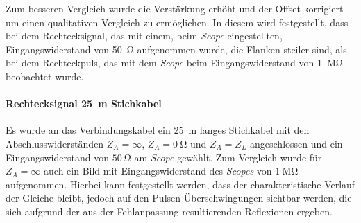 \documentclass[a4paper,twoside,final]{article}
\begin{document}
Zum besseren Vergleich wurde die Verstärkung erhöht und der Offset korrigiert um einen qualitativen Vergleich zu ermöglichen. In diesem wird festgestellt, dass bei dem Rechtecksignal, das mit einem, beim \textit{Scope} eingestellten, Eingangswiderstand von \SI{50}{\ohm} aufgenommen wurde, die Flanken steiler sind, als bei dem Rechteckpuls, das mit dem \textit{Scope} beim Eingangswiderstand von \SI{1}{\mega\ohm} beobachtet wurde.

\paragraph{Rechtecksignal \SI{25}{\metre} Stichkabel}\label{par:Stichkabel}
Es wurde an das Verbindungskabel ein \SI{25}{\metre} langes Stichkabel mit den Abschlusswiderständen $Z_A = \infty $, $Z_A = \SI{0}{\ohm}$ und $Z_A = Z_L$ angeschlossen und ein Eingangswiderstand von $\SI{50}{\ohm}$ am \textit{Scope} gewählt. Zum Vergleich wurde für $Z_A = \infty$ auch ein Bild mit Eingangswiderstand des \textit{Scopes} von $\SI{1}{\mega\ohm}$ aufgenommen. Hierbei kann festgestellt werden, dass der charakteristische Verlauf der Gleiche bleibt, jedoch auf den Pulsen Überschwingungen sichtbar werden, die sich aufgrund der aus der Fehlanpassung resultierenden Reflexionen ergeben.
\end{document}
